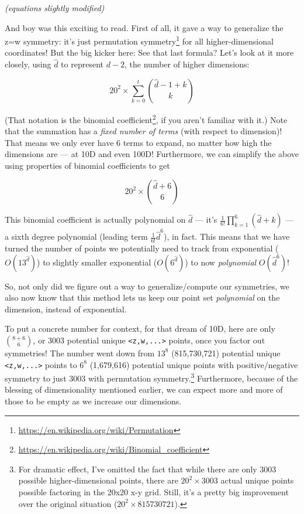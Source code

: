 \documentclass[]{article}
\renewcommand{\href}[2]{#2\footnote{\url{#1}}}
\begin{document}
\emph{(equations slightly modified)}

And boy was this exciting to read. First of all, it gave a way to generalize the
z=w symmetry: it's just
\href{https://en.wikipedia.org/wiki/Permutation}{permutation symmetry} for all
higher-dimensional coordinates! But the big kicker here: See that last formula?
Let's look at it more closely, using \(\hat{d}\) to represent \(d-2\), the
number of higher dimensions:

\[
20^2 \times \sum_{k=0}^{t} { {\hat{d}-1+k}\choose{k} }
\]

(That notation is the
\href{https://en.wikipedia.org/wiki/Binomial_coefficient}{binomial coefficient},
if you aren't familiar with it.) Note that the summation has a \emph{fixed
number of terms} (with respect to dimension)! That means we only ever have 6
terms to expand, no matter how high the dimensions are --- at 10D and even 100D!
Furthermore, we can simplify the above using properties of binomial coefficients
to get

\[
20^2 \times { {\hat{d}+6}\choose{6} }
\]

This binomial coefficient is actually polynomial on \(\hat{d}\) --- it's
\(\frac{1}{6!} \prod_{k=1}^6 (\hat{d}+k)\) --- a sixth degree polynomial
(leading term \(\frac{1}{6!} \hat{d}^6\)), in fact. This means that we have
turned the number of points we potentially need to track from exponential
(\(O(13^{\hat{d}})\)) to slightly smaller exponential (\(O(6^{\hat{d}})\)) to
now \emph{polynomial} \(O(\hat{d}^6)\)!

So, not only did we figure out a way to generalize/compute our symmetries, we
also now know that this method lets us keep our point set \emph{polynomial} on
the dimension, instead of exponential.

To put a concrete number for context, for that dream of 10D, here are only
\({ {8+6} \choose 6 }\), or 3003 potential unique
\texttt{\textless{}z,w,...\textgreater{}} points, once you factor out
symmetries! The number went down from \(13^8\) (815,730,721) potential unique
\texttt{\textless{}z,w,...\textgreater{}} points to \(6^8\) (1,679,616)
potential unique points with positive/negative symmetry to just 3003 with
permutation symmetry.\footnote{For dramatic effect, I've omitted the fact that
  while there are only 3003 possible higher-dimensional points, there are
  \(20^2 \times 3003\) actual unique points possible factoring in the 20x20 x-y
  grid. Still, it's a pretty big improvement over the original situation
  (\(20^2 \times 815730721\)).} Furthermore, because of the blessing of
dimensionality mentioned earlier, we can expect more and more of those to be
empty as we increase our dimensions.
\end{document}
